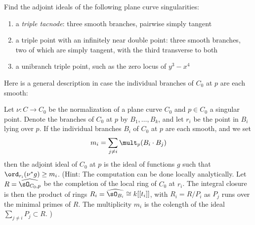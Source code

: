 \begin{exercise}
Find the adjoint ideals of the following plane curve singularities:
\begin{enumerate}
\item a \emph{triple tacnode}: three smooth branches, pairwise simply tangent
\item a triple point with an infinitely near double point: three smooth branches, two of which are simply tangent, with the third transverse to both
\item a unibranch triple point, such as the zero locus of $y^3-x^4$
\end{enumerate}
\end{exercise}

Here is a  general description in case the individual branches of $C_0$ at $p$ are each smooth:

\begin{exercise}
Let $\nu : C \to C_0$ be the normalization of a plane curve $C_0$ and $p \in C_0$ a singular point. Denote the branches of $C_0$ at $p$ by $B_1,\dots,B_k$, and let $r_i$ be the point in $B_i$ lying over $p$. If the individual branches $B_i$ of $C_0$ at $p$ are each smooth, and we set
$$
m_i = \sum_{j \neq i} \mult_p(B_i \cdot B_j)
$$
then the adjoint ideal of $C_0$ at $p$ is the ideal of functions $g$ such that $\ord_{r_i}(\nu^*g) \geq m_i$.
(Hint: The computation can be done locally analytically. Let $R = \widehat{\sO_{C_0, p}}$ be the completion of the local ring
of $C_0$ at $r_i$. The integral closure is then the product of rings $R_i = \widehat{\sO_{B_i}} \cong k[[t_i]]$,
with $R_i = R/P_i$ as $P_j$ runs over the minimal primes of $R$. The multiplicity
$m_i$ is the colength of the ideal $\sum_{j\neq i}P_j \subset R$.
)
\end{exercise}





